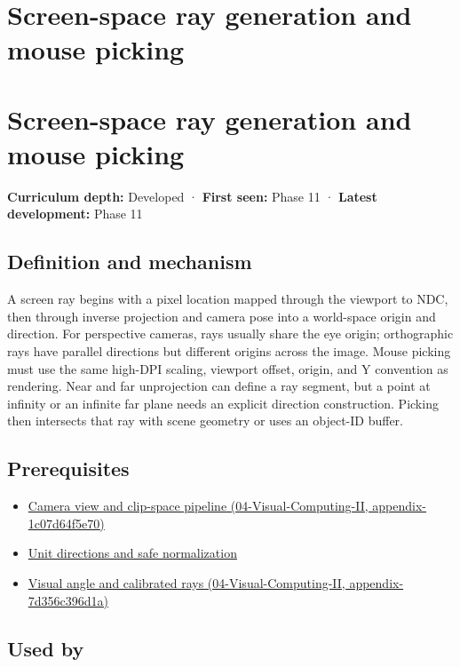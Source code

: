\hypertarget{appendix-f1a6d43e80d1}{}
\section*{Screen-space ray generation and mouse picking}
\section{Screen-space ray generation and mouse picking}\label{screen-space-ray-generation-and-mouse-picking}

\textbf{Curriculum depth:} Developed · \textbf{First seen:} Phase 11 · \textbf{Latest development:} Phase 11

\subsection{Definition and mechanism}\label{definition-and-mechanism}

A screen ray begins with a pixel location mapped through the viewport to NDC, then through inverse projection and camera pose into a world-space origin and direction. For perspective cameras, rays usually share the eye origin; orthographic rays have parallel directions but different origins across the image. Mouse picking must use the same high-DPI scaling, viewport offset, origin, and Y convention as rendering. Near and far unprojection can define a ray segment, but a point at infinity or an infinite far plane needs an explicit direction construction. Picking then intersects that ray with scene geometry or uses an object-ID buffer.

\subsection{Prerequisites}\label{prerequisites}

\begin{itemize}
\tightlist
\item
  \href{}{Camera view and clip-space pipeline (04-Visual-Computing-II, appendix-1c07d64f5e70)}
\item
  \hyperref[appendix-f744e41b95b4]{Unit directions and safe normalization}
\item
  \href{}{Visual angle and calibrated rays (04-Visual-Computing-II, appendix-7d356c396d1a)}
\end{itemize}

\subsection{Used by}\label{used-by}

